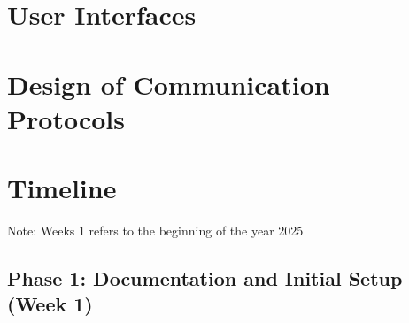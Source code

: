 \documentclass[12pt, titlepage]{article}
\begin{document}
\section{User Interfaces}


\section{Design of Communication Protocols}


\section{Timeline}

Note: Weeks 1 refers to the beginning of the year 2025

\subsection*{Phase 1: Documentation and Initial Setup (Week 1)}
\end{document}

